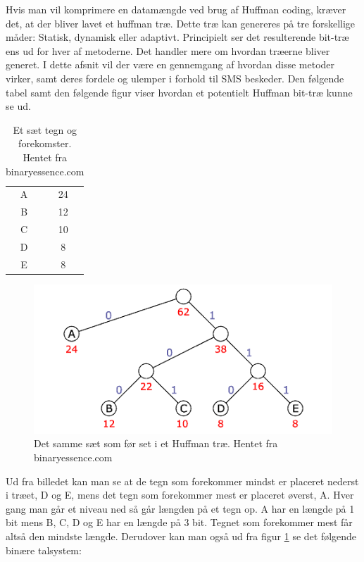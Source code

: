 Hvis man vil komprimere en datamængde ved brug af Huffman coding, kræver det, at der bliver lavet et huffman træ. Dette træ kan genereres på tre forskellige måder: Statisk, dynamisk eller adaptivt. Principielt ser det resulterende bit-træ ens ud for hver af metoderne. Det handler mere om hvordan træerne bliver generet. I dette afsnit vil der være en gennemgang af hvordan disse metoder virker, samt deres fordele og ulemper i forhold til SMS beskeder. Den følgende tabel samt den følgende figur viser hvordan et potentielt Huffman bit-træ kunne se ud.

\begin{table}[H]
\begin{center}
\begin{tabular}{|c|c|}
\hline
\cellcolor{ForestGreen}\color{white}{\textbf{Tegn}}& \cellcolor{ForestGreen}\color{white}{\textbf{Forekomster}}\\[2ex] \hline
A & 24 \\ \hline
B & 12 \\ \hline
C & 10 \\ \hline
D & 8 \\ \hline
E & 8 \\ \hline
\end{tabular} 
\caption{Et sæt tegn og forekomster. Hentet fra binaryessence.com}
\end{center}
\end{table}

\begin{figure}[H]
\centering
\includegraphics[width=\linewidth]{Billeder/huffman_tree.png}
\caption{Det samme sæt som før set i et Huffman træ. Hentet fra binaryessence.com\cite{Hufftree_1}}
\label{fig:huffmantree_fred}
\end{figure}

Ud fra billedet kan man se at de tegn som forekommer mindst er placeret nederst i træet, D og E, mens det tegn som forekommer mest er placeret øverst, A. Hver gang man går et niveau ned så går længden på et tegn op. A har en længde på 1 bit mens B, C, D og E har en længde på 3 bit. Tegnet som forekommer mest får altså den mindste længde. Derudover kan man også ud fra figur \ref{fig:huffmantree_fred} se det følgende binære talsystem:

